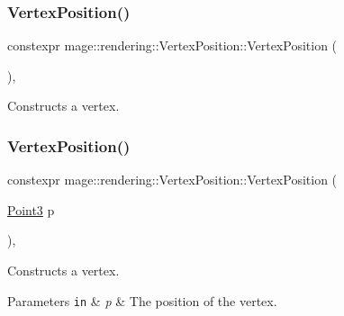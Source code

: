 \subsubsection{\texorpdfstring{Vertex\+Position()}{VertexPosition()}\hspace{0.1cm}{\footnotesize\ttfamily [1/4]}}
{\footnotesize\ttfamily constexpr mage\+::rendering\+::\+Vertex\+Position\+::\+Vertex\+Position (\begin{DoxyParamCaption}{ }\end{DoxyParamCaption})\hspace{0.3cm}{\ttfamily [default]}, {\ttfamily [noexcept]}}

Constructs a vertex. \hypertarget{structmage_1_1rendering_1_1_vertex_position_afeb47bb7062e42f0bdaf7039abc4b7cb}{}\label{structmage_1_1rendering_1_1_vertex_position_afeb47bb7062e42f0bdaf7039abc4b7cb} 
\subsubsection{\texorpdfstring{Vertex\+Position()}{VertexPosition()}\hspace{0.1cm}{\footnotesize\ttfamily [2/4]}}
{\footnotesize\ttfamily constexpr mage\+::rendering\+::\+Vertex\+Position\+::\+Vertex\+Position (\begin{DoxyParamCaption}\item[{\hyperlink{structmage_1_1_point3}{Point3}}]{p }\end{DoxyParamCaption})\hspace{0.3cm}{\ttfamily [explicit]}, {\ttfamily [noexcept]}}

Constructs a vertex.


\begin{DoxyParams}[1]{Parameters}
\mbox{\tt in}  & {\em p} & The position of the vertex. \\
\hline
\end{DoxyParams}
\hypertarget{structmage_1_1rendering_1_1_vertex_position_a2f93e143d8e24b4de51eea1e73e8ad62}{}\label{structmage_1_1rendering_1_1_vertex_position_a2f93e143d8e24b4de51eea1e73e8ad62} 
